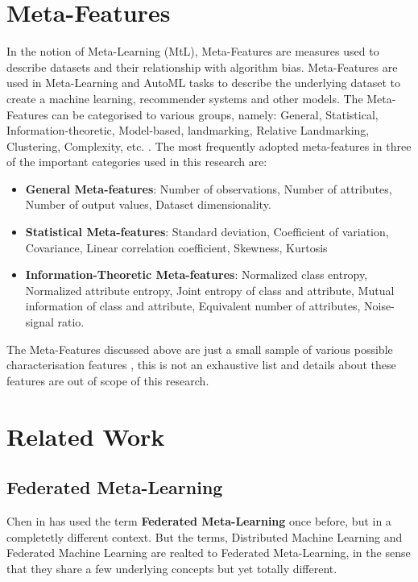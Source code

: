 \fi

\section{Meta-Features}
\label{meta-feat-realted-work}
In the notion of Meta-Learning (MtL), Meta-Features are measures used to describe datasets and their relationship with algorithm bias. Meta-Features are used in Meta-Learning and AutoML tasks to describe the underlying dataset to create a machine learning, recommender systems and other models. The Meta-Features can be categorised to various groups, namely: General, Statistical, Information-theoretic, Model-based, landmarking, Relative Landmarking, Clustering, Complexity, etc. \citep{meta-features-1} \citep{meta-features-2} \citep{meta-features-3}. The most frequently adopted meta-features in three of the important categories used in this research are:
\begin{itemize}
    \item \textbf{General Meta-features}:
    Number of observations, Number of attributes, Number of output values, Dataset dimensionality.
    
    \item \textbf{Statistical Meta-features}:
    Standard deviation, Coeﬃcient of variation, Covariance, Linear correlation coeﬃcient, Skewness, Kurtosis
    
    \item \textbf{Information-Theoretic Meta-features}:
    Normalized class entropy, Normalized attribute entropy, Joint entropy of class and attribute, Mutual information of class and attribute, Equivalent number of attributes, Noise-signal ratio.
\end{itemize}

The Meta-Features discussed above are just a small sample of various possible characterisation features \citep{meta-features-1} \citep{meta-features-2} \citep{meta-features-3} , this is not an exhaustive list and details about these features are out of scope of this research.

\section{Related Work}

\subsection{Federated Meta-Learning}
Chen in \citep{chen-et-al} has used the term \textbf{Federated Meta-Learning} once before, but in a completetly different context. But the terms, Distributed Machine Learning \citep{disml} and Federated Machine Learning \citep{fedml-google} are realted to Federated Meta-Learning, in the sense that they share a few underlying concepts but yet totally different.

